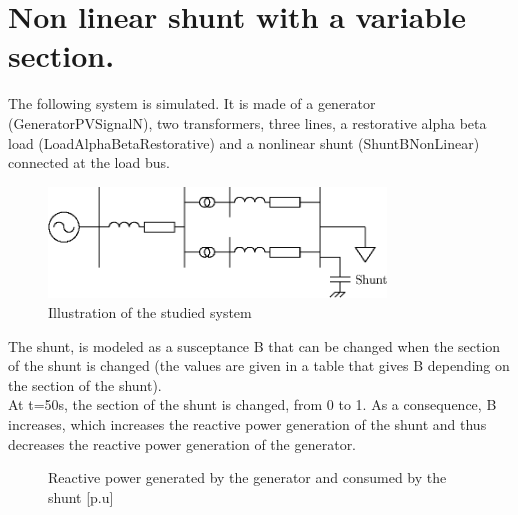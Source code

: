 \documentclass[a4paper, 12pt]{report}
\begin{document}
\chapter{Non linear shunt with a variable section.}

The following system is simulated. It is made of a generator (GeneratorPVSignalN), two transformers, three lines, a restorative alpha beta load (LoadAlphaBetaRestorative) and a nonlinear shunt (ShuntBNonLinear) connected at the load bus.\\

\begin{figure}[H]
  \begin{center}
  \includegraphics[width=0.8\textwidth]{ShuntsNoRegulation}
  \end{center}
  \caption{Illustration of the studied system}
\end{figure}

The shunt, is modeled as a susceptance B that can be changed when the section of the shunt is changed (the values are given in a table that gives B depending on the section of the shunt).\\

At t=50s, the section of the shunt is changed, from 0 to 1. As a consequence, B increases, which increases the reactive power generation of the shunt and thus decreases the reactive power generation of the generator.\\


\begin{figure}[H]
  \caption{Reactive power generated by the generator and consumed by the shunt [p.u]}
\end{figure}
\end{document}
